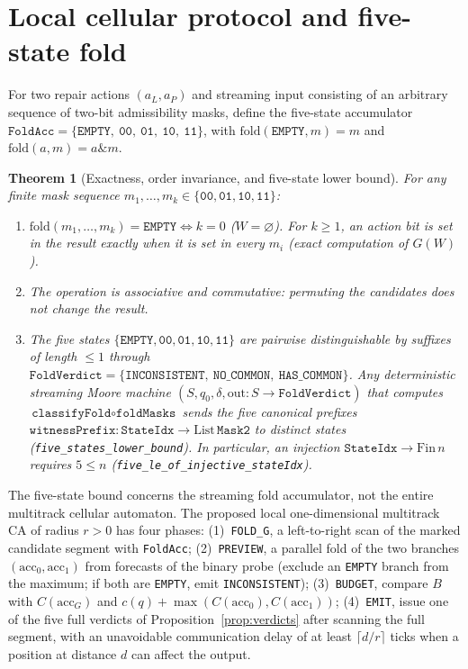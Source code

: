 \documentclass[11pt,a4paper]{article}
\theoremstyle{preprintthm}
\newtheorem{theorem}{Theorem}[section]
\theoremstyle{preprintdef}
\begin{document}
\section{Local cellular protocol and five-state fold}

For two repair actions $(a_L,a_P)$ and streaming input consisting of an arbitrary sequence of two-bit admissibility masks, define the five-state accumulator $\texttt{FoldAcc}=\{\texttt{EMPTY},\ \texttt{00},\ \texttt{01},\ \texttt{10},\ \texttt{11}\}$, with $\mathrm{fold}(\texttt{EMPTY},m)=m$ and $\mathrm{fold}(a,m)=a\mathbin{\&}m$.

\begin{theorem}[Exactness, order invariance, and five-state lower bound]
\label{thm:fold5}
For any finite mask sequence $m_1,\dots,m_k\in\{\texttt{00},\texttt{01},\texttt{10},\texttt{11}\}$:
\begin{enumerate}
  \item $\mathrm{fold}(m_1,\dots,m_k)=\texttt{EMPTY}\iff k=0$ ($W=\varnothing$). For $k\ge1$, an action bit is set in the result exactly when it is set in every $m_i$ (exact computation of $G(W)$).
  \item The operation is associative and commutative: permuting the candidates does not change the result.
  \item The five states $\{\texttt{EMPTY},\texttt{00},\texttt{01},\texttt{10},\texttt{11}\}$ are pairwise distinguishable by suffixes of length $\le1$ through $\texttt{FoldVerdict}=\{\texttt{INCONSISTENT},\ \texttt{NO\_COMMON},\ \texttt{HAS\_COMMON}\}$. Any deterministic streaming Moore machine $(S,q_0,\delta,\mathrm{out}:S\to\texttt{FoldVerdict})$ that computes $\texttt{classifyFold}\circ\texttt{foldMasks}$ sends the five canonical prefixes $\texttt{witnessPrefix}:\texttt{StateIdx}\to\mathrm{List}\,\texttt{Mask2}$ to distinct states (\texttt{five\_states\_lower\_bound}). In particular, an injection $\texttt{StateIdx}\to\mathrm{Fin}\,n$ requires $5\le n$ (\texttt{five\_le\_of\_injective\_stateIdx}).
\end{enumerate}
\end{theorem}

The five-state bound concerns the streaming fold accumulator, not the entire multitrack cellular automaton. The proposed local one-dimensional multitrack CA of radius $r>0$ has four phases: (1)~\texttt{FOLD\_G}, a left-to-right scan of the marked candidate segment with \texttt{FoldAcc}; (2)~\texttt{PREVIEW}, a parallel fold of the two branches $(\mathrm{acc}_0,\mathrm{acc}_1)$ from forecasts of the binary probe (exclude an \texttt{EMPTY} branch from the maximum; if both are \texttt{EMPTY}, emit \texttt{INCONSISTENT}); (3)~\texttt{BUDGET}, compare $B$ with $C(\mathrm{acc}_G)$ and $c(q)+\max(C(\mathrm{acc}_0),C(\mathrm{acc}_1))$; (4)~\texttt{EMIT}, issue one of the five full verdicts of Proposition~\ref{prop:verdicts} after scanning the full segment, with an unavoidable communication delay of at least $\lceil d/r\rceil$ ticks when a position at distance $d$ can affect the output.
\end{document}
